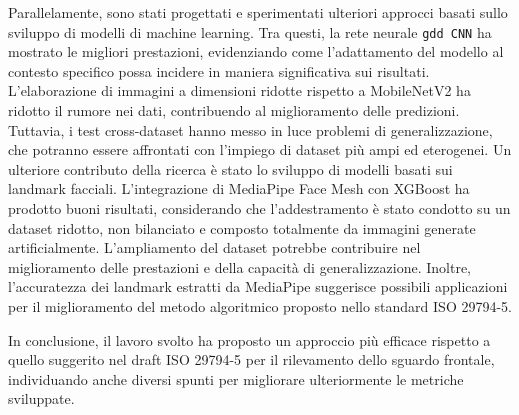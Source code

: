 \documentclass[12pt,a4paper,openright,twoside]{book}
\begin{document}
Parallelamente, sono stati progettati e sperimentati ulteriori approcci basati sullo sviluppo di modelli di machine learning. Tra questi, la rete neurale \texttt{gdd CNN} ha mostrato le migliori prestazioni, evidenziando come l'adattamento del modello al contesto specifico possa incidere in maniera significativa sui risultati. L'elaborazione di immagini a dimensioni ridotte rispetto a MobileNetV2 ha ridotto il rumore nei dati, contribuendo al miglioramento delle predizioni. Tuttavia, i test cross-dataset hanno messo in luce problemi di generalizzazione, che potranno essere affrontati con l'impiego di dataset più ampi ed eterogenei. 
Un ulteriore contributo della ricerca è stato lo sviluppo di modelli basati sui landmark facciali. L'integrazione di MediaPipe Face Mesh con XGBoost ha prodotto buoni risultati, considerando che l'addestramento è stato condotto su un dataset ridotto, non bilanciato e composto totalmente da immagini generate artificialmente. L'ampliamento del dataset potrebbe contribuire nel miglioramento delle prestazioni e della capacità di generalizzazione. Inoltre, l'accuratezza dei landmark estratti da MediaPipe suggerisce possibili applicazioni per il miglioramento del metodo algoritmico proposto nello standard ISO 29794-5.  

In conclusione, il lavoro svolto ha proposto un approccio più efficace rispetto a quello suggerito nel draft ISO 29794-5 per il rilevamento dello sguardo frontale, individuando anche diversi spunti per migliorare ulteriormente le metriche sviluppate.




\backmatter



\end{document}
